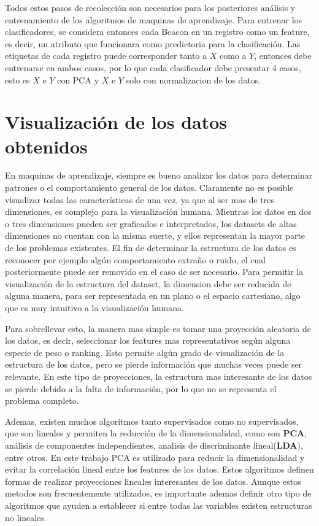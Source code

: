 Todos estos pasos de recolección son necesarios para los posteriores análisis y entrenamiento de los algoritmos de maquinas de aprendizaje. Para entrenar los clasificadores, se considera entonces cada Beacon en un registro como un feature, es decir, un atributo que funcionara como predictoria para la clasificación. Las etiquetas de cada registro puede corresponder tanto a $X$ como a $Y$, entonces debe entrenarse en ambos casos, por lo que cada clasificador debe presentar 4 casos, esto es $X$ e $Y$ con PCA y $X$ e $Y$ solo con normalizacion de los datos.


\section{Visualización de los datos obtenidos}

En maquinas de aprendizaje, siempre es bueno analizar los datos para determinar patrones o el comportamiento general de los datos. Claramente no es posible visualizar todas las características de una vez, ya 	que al ser mas de tres dimensiones, es complejo para la visualización humana. Mientras los datos en dos o tres  dimensiones pueden ser graficados e interpretados, los datasets de altas dimensiones no cuentan con la misma suerte, y ellos representan la mayor parte de los problemas existentes. El fin de determinar la estructura de los datos es reconocer por ejemplo algún comportamiento extraño o ruido, el cual posteriormente puede ser removido en el caso de ser necesario. Para permitir la visualización de la estructura del dataset, la dimension debe ser reducida de alguna manera, para ser representada en un plano o el espacio cartesiano, algo que es muy intuitivo a la visualización humana.

Para sobrellevar esto, la manera mas simple es tomar una proyección aleatoria de los datos, es decir, seleccionar los features mas representativos según alguna especie de peso o ranking. Esto permite algún grado de visualización de la estructura de los datos, pero se pierde información que muchas veces puede ser relevante. En este tipo de proyecciones, la estructura mas interesante de los datos se pierde debido a la falta de información, por lo que no se representa el problema completo.

Ademas, existen muchos algoritmos tanto supervisados como no supervisados, que son lineales y permiten la reducción de la dimensionalidad, como son \textbf{PCA},  análisis de componentes independientes, analisis de discriminante lineal(\textbf{LDA}), entre otros. En este trabajo PCA es utilizado para reducir la dimensionalidad y evitar la correlación lineal entre los features de los datos. Estos algoritmos definen formas de realizar proyecciones lineales interesantes de los datos. Aunque estos metodos son frecuentemente utilizados, es importante ademas definir otro tipo de algoritmos que ayuden a establecer si entre todas las variables existen estructuras no lineales.

